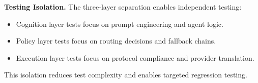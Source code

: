 \textbf{Testing Isolation.} The three-layer separation enables independent testing:
\begin{itemize}
    \item Cognition layer tests focus on prompt engineering and agent logic.
    \item Policy layer tests focus on routing decisions and fallback chains.
    \item Execution layer tests focus on protocol compliance and provider translation.
\end{itemize}

This isolation reduces test complexity and enables targeted regression testing.
